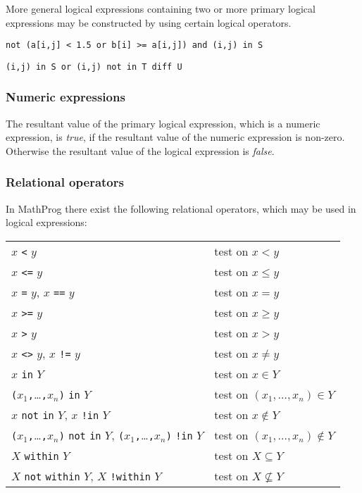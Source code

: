 \documentclass[10pt]{article}
\begin{document}
\medskip

More general logical expressions containing two or more primary logical
expressions may be constructed by using certain logical operators.

\newpage


\medskip

\noindent\verb|not (a[i,j] < 1.5 or b[i] >= a[i,j]) and (i,j) in S|

\noindent\verb|(i,j) in S or (i,j) not in T diff U|

\subsubsection{Numeric expressions}

The resultant value of the primary logical expression, which is a
numeric expression, is {\it true}, if the resultant value of the
numeric expression is non-zero. Otherwise the resultant value of the
logical expression is {\it false}.

\subsubsection{Relational operators}

In MathProg there exist the following relational operators, which may
be used in logical expressions:

\medskip

\begin{tabular}{@{}ll@{}}
$x$ {\tt<} $y$&test on $x<y$\\
$x$ {\tt<=} $y$&test on $x\leq y$\\
$x$ {\tt=} $y$, $x$ {\tt==} $y$&test on $x=y$\\
$x$ {\tt>=} $y$&test on $x\geq y$\\
$x$ {\tt>} $y$&test on $x>y$\\
$x$ {\tt<>} $y$, $x$ {\tt!=} $y$&test on $x\neq y$\\
$x$ {\tt in} $Y$&test on $x\in Y$\\
{\tt(}$x_1${\tt,}\dots{\tt,}$x_n${\tt)} {\tt in} $Y$&test on
$(x_1,\dots,x_n)\in Y$\\
$x$ {\tt not} {\tt in} $Y$, $x$ {\tt!in} $Y$&test on $x\not\in Y$\\
{\tt(}$x_1${\tt,}\dots{\tt,}$x_n${\tt)} {\tt not} {\tt in} $Y$,
{\tt(}$x_1${\tt,}\dots{\tt,}$x_n${\tt)} {\tt !in} $Y$&test on
$(x_1,\dots,x_n)\not\in Y$\\
$X$ {\tt within} $Y$&test on $X\subseteq Y$\\
$X$ {\tt not} {\tt within} $Y$, $X$ {\tt !within} $Y$&test on
$X\not\subseteq Y$\\
\end{tabular}
\end{document}
